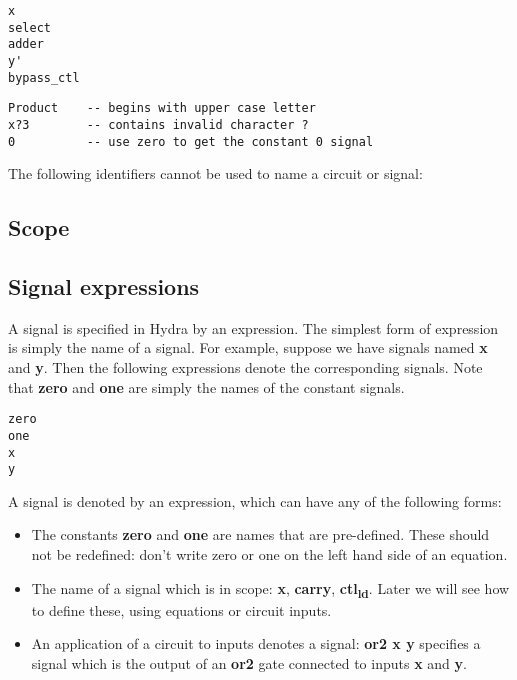 \documentclass[11pt]{article}
\begin{document}
\begin{verbatim}
x
select
adder
y'
bypass_ctl
\end{verbatim}

\begin{verbatim}
Product    -- begins with upper case letter
x?3        -- contains invalid character ?
0          -- use zero to get the constant 0 signal
\end{verbatim}

The following identifiers cannot be used to name a circuit or signal:

\subsection{Scope}
\label{sec:orged2c567}

\subsection{Signal expressions}
\label{sec:org9d369e3}

A signal is specified in Hydra by an expression.  The simplest form of
expression is simply the name of a signal.  For example, suppose we
have signals named \textbf{x} and \textbf{y}.  Then the following expressions denote
the corresponding signals.  Note that \textbf{zero} and \textbf{one} are simply the
names of the constant signals.

\begin{verbatim}
zero
one
x
y
\end{verbatim}

A signal is denoted by an expression, which can have any of the
following forms:

\begin{itemize}
\item The constants \textbf{zero} and \textbf{one} are names that are pre-defined.
These should not be redefined: don't write zero or one on the left
hand side of an equation.

\item The name of a signal which is in scope: \textbf{x}, \textbf{carry}, \textbf{ctl\textsubscript{ld}}.
Later we will see how to define these, using equations or circuit
inputs.

\item An application of a circuit to inputs denotes a signal: \textbf{or2 x y}
specifies a signal which is the output of an \textbf{or2} gate connected to
inputs \textbf{x} and \textbf{y}.
\end{itemize}
\end{document}
